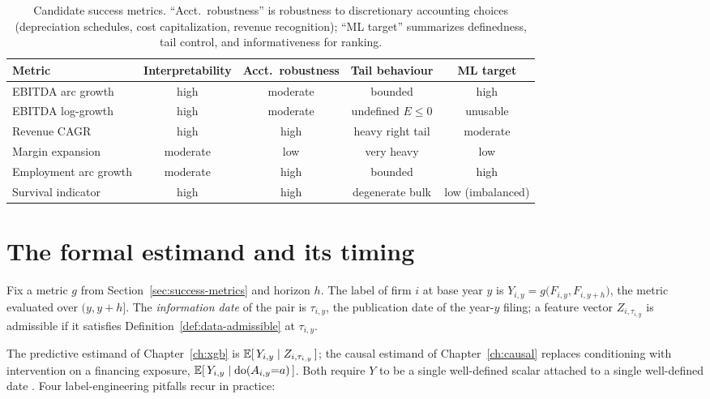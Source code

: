 \begin{table}[htbp]
\centering
\small
\setlength{\tabcolsep}{4pt}
\begin{tabular}{lcccc}
\toprule
Metric & Interpretability & Acct.\ robustness & Tail behaviour & ML target \\
\midrule
EBITDA arc growth      & high     & moderate & bounded        & high \\
EBITDA log-growth      & high     & moderate & undefined $E \le 0$ & unusable \\
Revenue CAGR           & high     & high     & heavy right tail & moderate \\
Margin expansion       & moderate & low      & very heavy      & low \\
Employment arc growth  & moderate & high     & bounded        & high \\
Survival indicator     & high     & high     & degenerate bulk & low (imbalanced) \\
\bottomrule
\end{tabular}
\caption{Candidate success metrics. ``Acct.\ robustness'' is robustness to
discretionary accounting choices (depreciation schedules, cost capitalization, revenue
recognition); ``ML target'' summarizes definedness, tail control, and
informativeness for ranking.}
\label{tab:success-metrics}
\end{table}

\section{The formal estimand and its timing}
\label{sec:success-estimand}

\begin{definition}
\label{def:success-label}
Fix a metric $g$ from Section~\ref{sec:success-metrics} and horizon $h$. The label of
firm $i$ at base year $y$ is $Y_{i,y} = g\big(F_{i,y}, F_{i,y+h}\big)$, the metric
evaluated over $(y, y+h]$. The \emph{information date} of the pair is
$\tau_{i,y}$, the publication date of the year-$y$ filing; a feature vector $Z_{i,\tau_{i,y}}$
is admissible if it satisfies Definition~\ref{def:data-admissible} at $\tau_{i,y}$.
\end{definition}

The predictive estimand of Chapter~\ref{ch:xgb} is
$\mathbb{E}[\,Y_{i,y} \mid Z_{i,\tau_{i,y}}\,]$; the causal estimand of Chapter~\ref{ch:causal}
replaces conditioning with intervention on a financing exposure,
$\mathbb{E}[\,Y_{i,y} \mid \mathrm{do}(A_{i,y}{=}a)\,]$. Both require $Y$ to be a single well-defined
scalar attached to a single well-defined date \cite{hernan2020}. Four label-engineering
pitfalls recur in practice:

